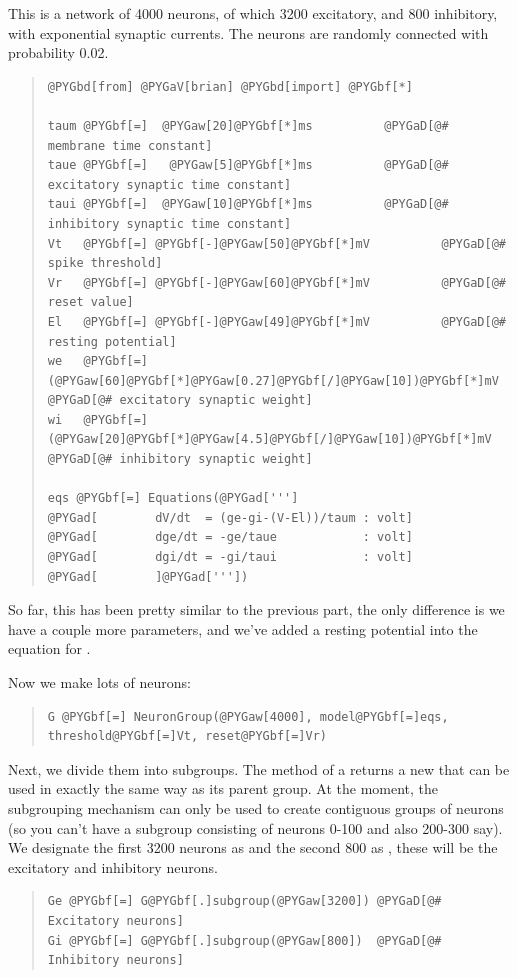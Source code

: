 \documentclass[letterpaper,10pt,english]{manual}
\begin{document}
This is a network of 4000 neurons, of which 3200 excitatory, and 800 inhibitory, with
exponential synaptic currents. The neurons are randomly connected with probability 0.02.
\begin{quote}

\begin{Verbatim}[commandchars=@\[\]]
@PYGbd[from] @PYGaV[brian] @PYGbd[import] @PYGbf[*]

taum @PYGbf[=]  @PYGaw[20]@PYGbf[*]ms          @PYGaD[@# membrane time constant]
taue @PYGbf[=]   @PYGaw[5]@PYGbf[*]ms          @PYGaD[@# excitatory synaptic time constant]
taui @PYGbf[=]  @PYGaw[10]@PYGbf[*]ms          @PYGaD[@# inhibitory synaptic time constant]
Vt   @PYGbf[=] @PYGbf[-]@PYGaw[50]@PYGbf[*]mV          @PYGaD[@# spike threshold]
Vr   @PYGbf[=] @PYGbf[-]@PYGaw[60]@PYGbf[*]mV          @PYGaD[@# reset value]
El   @PYGbf[=] @PYGbf[-]@PYGaw[49]@PYGbf[*]mV          @PYGaD[@# resting potential]
we   @PYGbf[=] (@PYGaw[60]@PYGbf[*]@PYGaw[0.27]@PYGbf[/]@PYGaw[10])@PYGbf[*]mV @PYGaD[@# excitatory synaptic weight]
wi   @PYGbf[=]  (@PYGaw[20]@PYGbf[*]@PYGaw[4.5]@PYGbf[/]@PYGaw[10])@PYGbf[*]mV @PYGaD[@# inhibitory synaptic weight]

eqs @PYGbf[=] Equations(@PYGad[''']
@PYGad[        dV/dt  = (ge-gi-(V-El))/taum : volt]
@PYGad[        dge/dt = -ge/taue            : volt]
@PYGad[        dgi/dt = -gi/taui            : volt]
@PYGad[        ]@PYGad['''])
\end{Verbatim}
\end{quote}

So far, this has been pretty similar to the previous part, the only
difference is we have a couple more parameters, and we've added a
resting potential  into the equation for .

Now we make lots of neurons:
\begin{quote}

\begin{Verbatim}[commandchars=@\[\]]
G @PYGbf[=] NeuronGroup(@PYGaw[4000], model@PYGbf[=]eqs, threshold@PYGbf[=]Vt, reset@PYGbf[=]Vr)
\end{Verbatim}
\end{quote}

Next, we divide them into subgroups. The \hyperlink{brian.NeuronGroup.subgroup}{} method of a
\hyperlink{brian.NeuronGroup}{} returns a new \hyperlink{brian.NeuronGroup}{} that can be used in
exactly the same way as its parent group. At the moment, the
subgrouping mechanism can only be used to create contiguous
groups of neurons (so you can't have a subgroup consisting
of neurons 0-100 and also 200-300 say). We designate the
first 3200 neurons as  and the second 800 as , these
will be the excitatory and inhibitory neurons.
\begin{quote}

\begin{Verbatim}[commandchars=@\[\]]
Ge @PYGbf[=] G@PYGbf[.]subgroup(@PYGaw[3200]) @PYGaD[@# Excitatory neurons]
Gi @PYGbf[=] G@PYGbf[.]subgroup(@PYGaw[800])  @PYGaD[@# Inhibitory neurons]
\end{Verbatim}
\end{quote}
\end{document}
